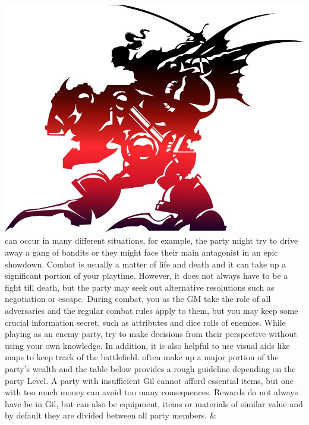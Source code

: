 %
%
\\\\
%
\includegraphics[width=\columnwidth]{./art/images/ff6.jpg}
%
\vfill
%
 can occur in many different situations, for example, the party might try to drive away a gang of bandits or they might face their main antagonist in an epic showdown.
Combat is usually a matter of life and death and it can take up a significant portion of your playtime.
However, it does not always have to be a fight till death, but the party may seek out alternative resolutions such as negotiation or escape.
During combat, you as the GM take the role of all adversaries and the regular combat rules apply to them, but you may keep some crucial information secret, such as attributes and dice rolls of enemies.
While playing as an enemy party, try to make decisions from their perspective without using your own knowledge.
In addition, it is also helpful to use visual aids like maps to keep track of the battlefield.
 often make up a major portion of the party's wealth and the table below provides a rough guideline depending on the party Level.
A party with insufficient Gil cannot afford essential items, but one with too much money can avoid too many consequences.
Rewards do not always have be in Gil, but can also be equipment, items or materials of similar value and by default they are divided between all party members.
%
\vfill
%
{ & }
